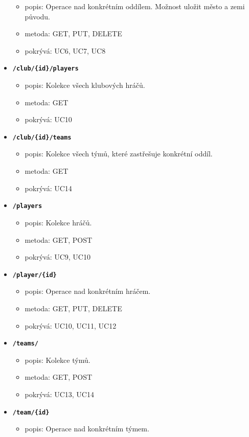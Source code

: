 \begin{itemize}
\begin{itemize}
    \item popis: Operace nad konkrétním oddílem. Možnost uložit město a zemi původu.
    \item metoda: GET, PUT, DELETE
    \item pokrývá: UC6, UC7, UC8
  \end{itemize}
  \item \texttt{\textbf{/club/\{id\}/players}}
  \begin{itemize}
    \item popis: Kolekce všech klubových hráčů.
    \item metoda: GET
    \item pokrývá: UC10
  \end{itemize}
  \item \texttt{\textbf{/club/\{id\}/teams}}
  \begin{itemize}
    \item popis: Kolekce všech týmů, které zastřešuje konkrétní oddíl.
    \item metoda: GET
    \item pokrývá: UC14
  \end{itemize}
  \item \texttt{\textbf{/players}}
  \begin{itemize}
    \item popis: Kolekce hráčů.
    \item metoda: GET, POST
    \item pokrývá: UC9, UC10
  \end{itemize}
  \item \texttt{\textbf{/player/\{id\}}}
  \begin{itemize}
    \item popis: Operace nad konkrétním hráčem.
    \item metoda: GET, PUT, DELETE
    \item pokrývá: UC10, UC11, UC12
  \end{itemize}
  \item \texttt{\textbf{/teams/}}
  \begin{itemize}
    \item popis: Kolekce týmů.
    \item metoda: GET, POST
    \item pokrývá: UC13, UC14
  \end{itemize}
  \item \texttt{\textbf{/team/\{id\}}}
  \begin{itemize}
    \item popis: Operace nad konkrétním týmem.

\end{itemize}
\end{itemize}
